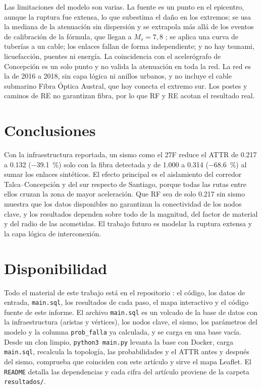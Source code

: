 \documentclass[conference]{IEEEtran}
\begin{document}
Las limitaciones del modelo son varias.
La fuente es un punto en el epicentro, aunque la ruptura fue extensa, lo que subestima el daño en los extremos; se usa la mediana de la atenuación sin dispersión y se extrapola más allá de los eventos de calibración de la fórmula, que llegan a $M_s=7{,}8$ \cite{saragoni2004}; se aplica una curva de tuberías a un cable; los enlaces fallan de forma independiente; y no hay tsunami, licuefacción, puentes ni energía.
La coincidencia con el acelerógrafo de Concepción es un solo punto y no valida la atenuación en toda la red.
La red es la de 2016 a 2018, sin capa lógica ni anillos urbanos, y no incluye el cable submarino Fibra Óptica Austral, que hoy conecta el extremo sur.
Los postes y caminos de RE no garantizan fibra, por lo que RF y RE acotan el resultado real.

\section{Conclusiones}
\label{sec:conclusiones}
Con la infraestructura reportada, un sismo como el 27F reduce el ATTR de \num{0,217} a \num{0,132} (\SI{-39,1}{\percent}) solo con la fibra detectada y de \num{1,000} a \num{0,314} (\SI{-68,6}{\percent}) al sumar los enlaces sintéticos.
El efecto principal es el aislamiento del corredor Talca--Concepción y del sur respecto de Santiago, porque todas las rutas entre ellos cruzan la zona de mayor aceleración.
Que RF sea de solo \num{0,217} sin sismo muestra que los datos disponibles no garantizan la conectividad de los nodos clave, y los resultados dependen sobre todo de la magnitud, del factor de material y del radio de las acometidas.
El trabajo futuro es modelar la ruptura extensa y la capa lógica de interconexión.

\section*{Disponibilidad}
Todo el material de este trabajo está en el repositorio \cite{repositorio}: el código, los datos de entrada, \texttt{main.sql}, los resultados de cada paso, el mapa interactivo y el código fuente de este informe.
El archivo \texttt{main.sql} es un volcado de la base de datos con la infraestructura (aristas y vértices), los nodos clave, el sismo, los parámetros del modelo y la columna \texttt{prob\_falla} ya calculada, y se carga en una base vacía.
Desde un clon limpio, \texttt{python3 main.py} levanta la base con Docker, carga \texttt{main.sql}, recalcula la topología, las probabilidades y el ATTR antes y después del sismo, comprueba que coinciden con este artículo y sirve el mapa Leaflet.
El \texttt{README} detalla las dependencias y cada cifra del artículo proviene de la carpeta \texttt{resultados/}.
\end{document}

